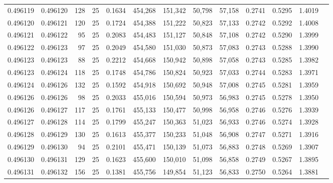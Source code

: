 \begin{tabular}{rrrrrrrrrrrrr}
0.496119 & 0.496120 &   128 &  25 &                                     0.1634 & 454,268 & 151,342 &  50,798 &  57,158 & 0.2741 & 0.5295 & 1.4019 \\
0.496120 & 0.496121 &   120 &  25 &                                     0.1724 & 454,388 & 151,222 &  50,823 &  57,133 & 0.2742 & 0.5292 & 1.4008 \\
0.496121 & 0.496122 &    95 &  25 &                                     0.2083 & 454,483 & 151,127 &  50,848 &  57,108 & 0.2742 & 0.5290 & 1.3999 \\
0.496122 & 0.496123 &    97 &  25 &                                     0.2049 & 454,580 & 151,030 &  50,873 &  57,083 & 0.2743 & 0.5288 & 1.3990 \\
0.496123 & 0.496123 &    88 &  25 &                                     0.2212 & 454,668 & 150,942 &  50,898 &  57,058 & 0.2743 & 0.5285 & 1.3982 \\
0.496123 & 0.496124 &   118 &  25 &                                     0.1748 & 454,786 & 150,824 &  50,923 &  57,033 & 0.2744 & 0.5283 & 1.3971 \\
0.496124 & 0.496126 &   132 &  25 &                                     0.1592 & 454,918 & 150,692 &  50,948 &  57,008 & 0.2745 & 0.5281 & 1.3959 \\
0.496126 & 0.496126 &    98 &  25 &                                     0.2033 & 455,016 & 150,594 &  50,973 &  56,983 & 0.2745 & 0.5278 & 1.3950 \\
0.496126 & 0.496127 &   117 &  25 &                                     0.1761 & 455,133 & 150,477 &  50,998 &  56,958 & 0.2746 & 0.5276 & 1.3939 \\
0.496127 & 0.496128 &   114 &  25 &                                     0.1799 & 455,247 & 150,363 &  51,023 &  56,933 & 0.2746 & 0.5274 & 1.3928 \\
0.496128 & 0.496129 &   130 &  25 &                                     0.1613 & 455,377 & 150,233 &  51,048 &  56,908 & 0.2747 & 0.5271 & 1.3916 \\
0.496129 & 0.496130 &    94 &  25 &                                     0.2101 & 455,471 & 150,139 &  51,073 &  56,883 & 0.2748 & 0.5269 & 1.3907 \\
0.496130 & 0.496131 &   129 &  25 &                                     0.1623 & 455,600 & 150,010 &  51,098 &  56,858 & 0.2749 & 0.5267 & 1.3895 \\
0.496131 & 0.496132 &   156 &  25 &                                     0.1381 & 455,756 & 149,854 &  51,123 &  56,833 & 0.2750 & 0.5264 & 1.3881 \\

\end{tabular}
